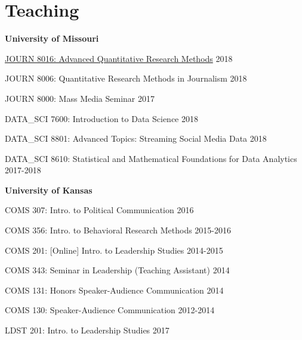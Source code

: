 
\section{Teaching}

  \textbf{University of Missouri}
    \begin{innerlist}
      \item \href{https://stat.mikewk.com}{JOURN 8016: Advanced Quantitative Research Methods}  \hfill 2018
      \item JOURN 8006: Quantitative Research Methods in Journalism                             \hfill 2018
      \item JOURN 8000: Mass Media Seminar                                                      \hfill 2017
      \item DATA\_SCI 7600: Introduction to Data Science                                        \hfill 2018
      \item DATA\_SCI 8801: Advanced Topics: Streaming Social Media Data                        \hfill 2018
      \item DATA\_SCI 8610: Statistical and Mathematical Foundations for Data Analytics         \hfill 2017-2018
    \end{innerlist}\vspace{1em}

  \textbf{University of Kansas}
    \begin{innerlist}
      \item COMS 307: Intro. to Political Communication                                 \hfill 2016
      \item COMS 356: Intro. to Behavioral Research Methods                             \hfill 2015-2016
      \item COMS 201: {[}Online{]} Intro. to Leadership Studies                         \hfill 2014-2015
      \item COMS 343: Seminar in Leadership (Teaching Assistant)                        \hfill 2014
      \item COMS 131: Honors Speaker-Audience Communication                             \hfill 2014
      \item COMS 130: Speaker-Audience Communication                                    \hfill 2012-2014
      \item LDST 201: Intro. to Leadership Studies                                      \hfill 2017
    \end{innerlist}\vspace{-.1in}
